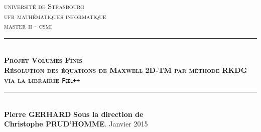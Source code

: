 
\begin{titlepage}
\newcommand{\HRule}{\rule{\linewidth}{0.5mm}}

\center
 
\textsc{\LARGE université de Strasbourg}\\[1.5cm]
\textsc{\Large ufr mathématiques informatique }\\[0.5cm]  
\textsc{\Large master ii - csmi}

\HRule \\

{ \textsc{\huge \bfseries Projet Volumes Finis\\
Résolution des équations de Maxwell 2D-TM par méthode RKDG via la librairie \texttt{Feel++}}}
\HRule \\
\vfill
\textbf{Pierre \textsc{GERHARD}}
\vfill
\textbf{Sous la direction de}\\
\textbf{Christophe \textsc{PRUD'HOMME}}.
\vfill
{\large Janvier 2015}\\[0cm]

\end{titlepage}
